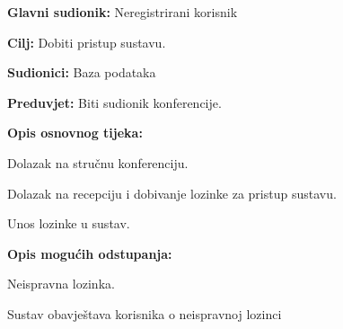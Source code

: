 					\noindent {}
					\begin{packed_item}
						
						\item \textbf{Glavni sudionik: }Neregistrirani korisnik
						\item  \textbf{Cilj:} Dobiti pristup sustavu.
						\item  \textbf{Sudionici:} Baza podataka
						\item  \textbf{Preduvjet:} Biti sudionik konferencije.
						\item  \textbf{Opis osnovnog tijeka:}
						
						\item[] \begin{packed_enum}
							
							\item Dolazak na stručnu konferenciju.
							\item Dolazak na recepciju i dobivanje lozinke za pristup sustavu.
							\item Unos lozinke u sustav.

						\end{packed_enum}
						
						\item  \textbf{Opis mogućih odstupanja:}
						
						\item[] \begin{packed_item}
							
							\item[3.a] Neispravna lozinka.
							\item[] \begin{packed_enum}
								
								\item Sustav obavještava korisnika o neispravnoj lozinci
								
							\end{packed_enum}
							
						\end{packed_item}
					\end{packed_item}
					
